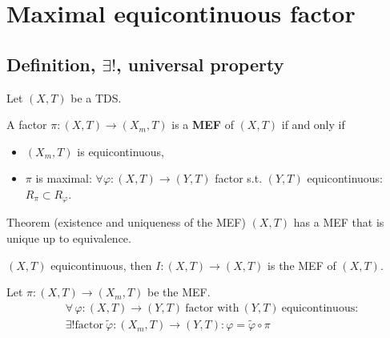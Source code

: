 \section{Maximal equicontinuous factor}
\subsection{Definition, $\exists!$, universal property}
\begin{frame}
  Let $(X,T)$ be a TDS.
  \begin{definition}
    A factor $\pi : (X,T) \to (X_m,T)$ is a \textbf{MEF} of $(X,T)$ if and only if
  \begin{itemize}
    \item $(X_m,T)$ is equicontinuous,
    \item $\pi$ is maximal: $\forall \varphi : (X,T) \to (Y,T)$ factor s.t. $(Y,T)$ equicontinuous: $R_\pi \subset R_\varphi$.
  \end{itemize}
\end{definition}
\pause
  \begin{alertblock}{Theorem (existence and uniqueness of the MEF)}
  $(X,T)$ has a MEF that is unique up to equivalence.
  \end{alertblock}
  \pause
\begin{example}
  $(X,T)$ equicontinuous, then $I: (X,T) \to (X,T)$ is the MEF of $(X,T)$.
\end{example}

\end{frame}
\begin{frame}[fragile]
\begin{proposition}
  Let $\pi : (X, T) \to  (X_m,T)$ be the MEF.
  \begin{equation*}
    \begin{split}
      &\forall \, \varphi : (X,T) \to (Y,T) \ \text{factor with} \ (Y,T) \ \text{equicontinuous}: \\
      & \exists! \text{factor} \ \tilde{\varphi}: (X_m,T) \to (Y,T): \varphi = \tilde{\varphi} \circ \pi
    \end{split}
      \end{equation*}
  \end{proposition}
  \begin{center}
  \end{center}
\end{frame}
